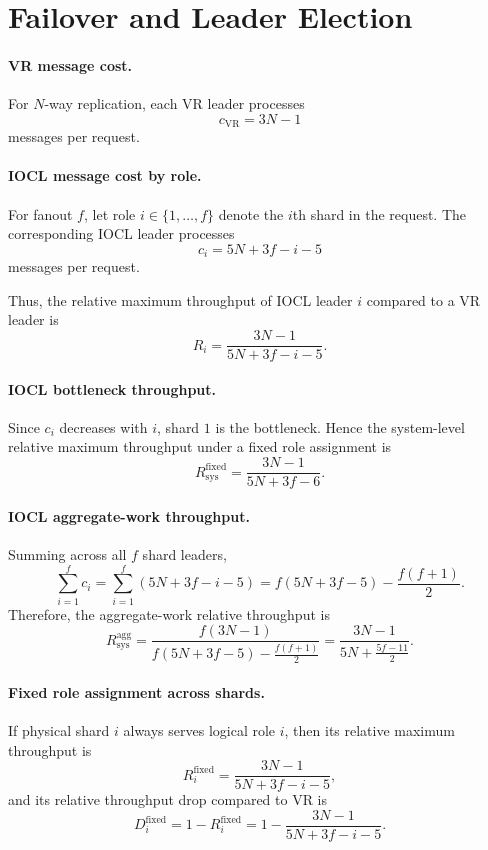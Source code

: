 \section{Failover and Leader Election}

\paragraph{VR message cost.}
For $N$-way replication, each VR leader processes
\[
c_{\mathrm{VR}} = 3N - 1
\]
messages per request.

\paragraph{IOCL message cost by role.}
For fanout $f$, let role $i \in \{1,\dots,f\}$ denote the $i$th shard in the request.
The corresponding IOCL leader processes
\[
c_i = 5N + 3f - i - 5
\]
messages per request.

Thus, the relative maximum throughput of IOCL leader $i$ compared to a VR leader is
\[
R_i = \frac{3N-1}{5N+3f-i-5}.
\]

\paragraph{IOCL bottleneck throughput.}
Since $c_i$ decreases with $i$, shard $1$ is the bottleneck. Hence the system-level
relative maximum throughput under a fixed role assignment is
\[
R_{\mathrm{sys}}^{\mathrm{fixed}}
= \frac{3N-1}{5N+3f-6}.
\]

\paragraph{IOCL aggregate-work throughput.}
Summing across all $f$ shard leaders,
\[
\sum_{i=1}^{f} c_i
= \sum_{i=1}^{f} (5N+3f-i-5)
= f(5N+3f-5) - \frac{f(f+1)}{2}.
\]
Therefore, the aggregate-work relative throughput is
\[
R_{\mathrm{sys}}^{\mathrm{agg}}
=
\frac{f(3N-1)}
{f(5N+3f-5)-\frac{f(f+1)}{2}}
=
\frac{3N-1}{5N+\frac{5f-11}{2}}.
\]

\paragraph{Fixed role assignment across shards.}
If physical shard $i$ always serves logical role $i$, then its relative maximum throughput is
\[
R_i^{\mathrm{fixed}}
=
\frac{3N-1}{5N+3f-i-5},
\]
and its relative throughput drop compared to VR is
\[
D_i^{\mathrm{fixed}}
=
1 - R_i^{\mathrm{fixed}}
=
1 - \frac{3N-1}{5N+3f-i-5}.
\]

